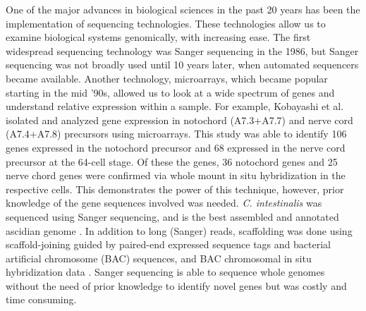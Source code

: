 One of the major advances in biological sciences in the past 20 years has been the implementation of sequencing technologies. These technologies allow us to examine biological systems genomically, with increasing ease. The first widespread sequencing technology was Sanger sequencing in the 1986, but Sanger sequencing was not broadly used until 10 years later, when automated sequencers became available. Another technology, microarrays, which became popular starting in the mid '90s, allowed us to look at a wide spectrum of genes and understand relative expression within a sample. For example, Kobayashi et al. \cite{kobayashi_differential_2013} isolated and analyzed gene expression in notochord (A7.3+A7.7) and nerve cord (A7.4+A7.8) precursors using microarrays. This study was able to identify 106 genes expressed in the notochord precursor and 68 expressed in the nerve cord precursor at the 64-cell stage. Of these the genes, 36 notochord genes and 25 nerve chord genes were confirmed via whole mount in situ hybridization in the respective cells. This demonstrates the power of this technique, however, prior knowledge of the gene sequences involved was needed. \textit{C. intestinalis} was sequenced using Sanger sequencing, and is the best assembled and annotated ascidian genome \cite{dehal_draft_2002}. In addition to long (Sanger) reads, scaffolding was done using scaffold-joining guided by paired-end expressed sequence tags and bacterial artificial chromosome (BAC) sequences, and BAC chromosomal in situ hybridization data \cite{satou_improved_2008}. Sanger sequencing is able to sequence whole genomes without the need of prior knowledge to identify novel genes but was costly and time consuming\cite{metzker_emerging_2005,liu_comparison_2012}. 

